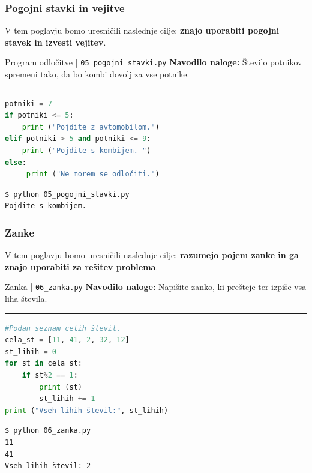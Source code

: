 
\subsubsection{Pogojni stavki in vejitve}
\label{sec:pogojni_stavki_vejitve}

V tem poglavju bomo uresničili naslednje cilje: \textbf{znajo
  uporabiti pogojni stavek in izvesti vejitev}.

\begin{examplebox}[label={prog:pogojni}]{Program odločitve |
    \texttt{05\_pogojni\_stavki.py} \cite{web:PTHardWay}}
\textbf{Navodilo naloge:}
Število potnikov spremeni tako, da bo kombi dovolj za vse potnike. 
\rule{\textwidth}{.4pt}
\begin{lstlisting}[language=Python]
potniki = 7
if potniki <= 5:
    print ("Pojdite z avtomobilom.")
elif potniki > 5 and potniki <= 9:
    print ("Pojdite s kombijem. ")
else:
     print ("Ne morem se odločiti.")
\end{lstlisting}
\tcblower
\begin{Verbatim}[fontsize=\footnotesize]
$ python 05_pogojni_stavki.py
Pojdite s kombijem.
\end{Verbatim}
\end{examplebox}


\subsubsection{Zanke}
\label{sec:zanke}

V tem poglavju bomo uresničili naslednje cilje: \textbf{razumejo pojem zanke
in ga znajo uporabiti za rešitev problema}.

\begin{examplebox}[label={prog:zanka}]{Zanka |
    \texttt{06\_zanka.py} \cite{web:PTHardWay}}
  \textbf{Navodilo naloge:} Napišite zanko, ki prešteje ter
  izpiše vsa liha števila. \\
  \rule{\textwidth}{.4pt}
\begin{lstlisting}[language=Python]
#Podan seznam celih števil.
cela_st = [11, 41, 2, 32, 12]
st_lihih = 0
for st in cela_st:
    if st%2 == 1:
        print (st)
        st_lihih += 1
print ("Vseh lihih števil:", st_lihih)
\end{lstlisting}
\tcblower
\begin{Verbatim}[fontsize=\footnotesize]
$ python 06_zanka.py
11
41
Vseh lihih števil: 2
\end{Verbatim}
\end{examplebox}

